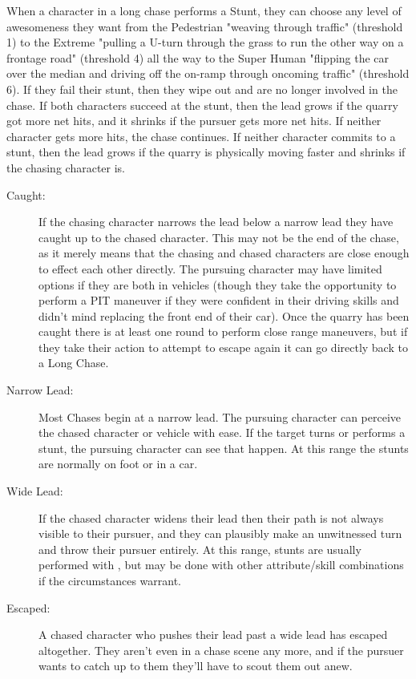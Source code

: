When a character in a long chase performs a Stunt, they can choose any level of awesomeness they want from the Pedestrian "weaving through traffic" (threshold 1) to the Extreme "pulling a U-turn through the grass to run the other way on a frontage road" (threshold 4) all the way to the Super Human "flipping the car over the median and driving off the on-ramp through oncoming traffic" (threshold 6). If they fail their stunt, then they wipe out and are no longer involved in the chase. If both characters succeed at the stunt, then the lead grows if the quarry got more net hits, and it shrinks if the pursuer gets more net hits. If neither character gets more hits, the chase continues. If neither character commits to a stunt, then the lead grows if the quarry is physically moving faster and shrinks if the chasing character is.

\begin{description}
\item[Caught:] If the chasing character narrows the lead below a narrow lead they have caught up to the chased character. This may not be the end of the chase, as it merely means that the chasing and chased characters are close enough to effect each other directly. The pursuing character may have limited options if they are both in vehicles (though they take the opportunity to perform a PIT maneuver if they were confident in their driving skills and didn't mind replacing the front end of their car). Once the quarry has been caught there is at least one round to perform close range maneuvers, but if they take their action to attempt to escape again it can go directly back to a Long Chase.
\item[Narrow Lead:] Most Chases begin at a narrow lead. The pursuing character can perceive the chased character or vehicle with ease. If the target turns or performs a stunt, the pursuing character can see that happen. At this range the stunts are normally  on foot or  in a car.
\item[Wide Lead:] If the chased character widens their lead then their path is not always visible to their pursuer, and they can plausibly make an unwitnessed turn and throw their pursuer entirely. At this range, stunts are usually performed with , but may be done with other attribute/skill combinations if the circumstances warrant.
\item[Escaped:] A chased character who pushes their lead past a wide lead has escaped altogether. They aren't even in a chase scene any more, and if the pursuer wants to catch up to them they'll have to scout them out anew.
\end{description}

